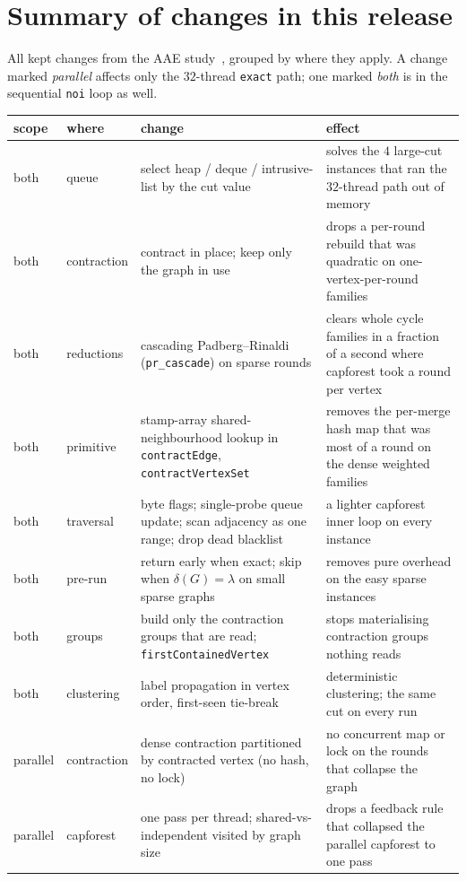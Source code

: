\documentclass[10pt]{article}
\newcommand{\cfg}[1]{\texttt{#1}}
\begin{document}
\newpage
\section{Summary of changes in this release}
All kept changes from the AAE study~\cite{aae}, grouped by where they apply. A
change marked \emph{parallel} affects only the $32$-thread \cfg{exact} path; one
marked \emph{both} is in the sequential \cfg{noi} loop as well.

\smallskip
\begin{center}
\begin{tabular}{@{}ll R{6.3cm} R{5.5cm}@{}}
\toprule
scope & where & change & effect\\
\midrule
both     & queue        & select heap / deque / intrusive-list by the cut value & solves the $4$ large-cut instances that ran the $32$-thread path out of memory\\
both     & contraction  & contract in place; keep only the graph in use & drops a per-round rebuild that was quadratic on one-vertex-per-round families\\
both     & reductions   & cascading Padberg--Rinaldi (\cfg{pr\_cascade}) on sparse rounds & clears whole cycle families in a fraction of a second where capforest took a round per vertex\\
both     & primitive    & stamp-array shared-neighbourhood lookup in \cfg{contractEdge}, \cfg{contractVertexSet} & removes the per-merge hash map that was most of a round on the dense weighted families\\
both     & traversal    & byte flags; single-probe queue update; scan adjacency as one range; drop dead blacklist & a lighter capforest inner loop on every instance\\
both     & pre-run      & return early when exact; skip when $\delta(G)=\lambda$ on small sparse graphs & removes pure overhead on the easy sparse instances\\
both     & groups       & build only the contraction groups that are read; \cfg{firstContainedVertex} & stops materialising contraction groups nothing reads\\
both     & clustering   & label propagation in vertex order, first-seen tie-break & deterministic clustering; the same cut on every run\\
parallel & contraction  & dense contraction partitioned by contracted vertex (no hash, no lock) & no concurrent map or lock on the rounds that collapse the graph\\
parallel & capforest    & one pass per thread; shared-vs-independent visited by graph size & drops a feedback rule that collapsed the parallel capforest to one pass\\

\end{tabular}
\end{center}
\end{document}
